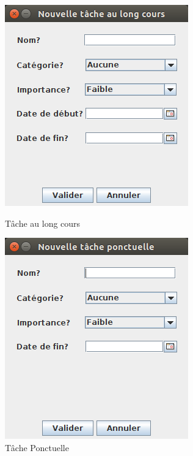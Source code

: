 \documentclass{article}
\begin{document}
\begin{figure}[!ht]
	\centering
	\begin{minipage}[t]{5cm}
		\centering
		\includegraphics [scale=0.34]{images/NewTAsk1.png}
		\caption{Tâche au long cours}
		\label{Tâche au long cours}
	\end{minipage}
	\begin{minipage}[t]{5cm}
		\centering
		\includegraphics [scale=0.34]{images/NewTAsk2.png}
		\caption {Tâche Ponctuelle}
		\label{Tâche Ponctuelle}
	\end{minipage}
\end{figure}
\end{document}

